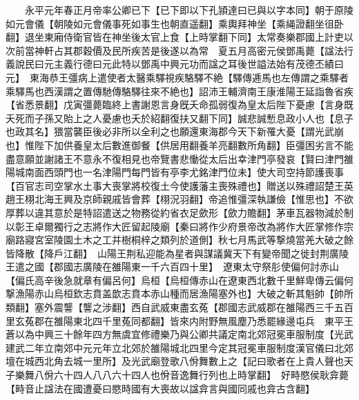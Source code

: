 　　永平元年春正月帝率公卿已下【已下即以下孔頴達曰已與以字本同】朝于原陵如元會儀【朝陵如元會儀事死如事生也朝直遥翻】乘輿拜神坐【乘䋲證翻坐徂卧翻】退坐東廂侍衛官皆在神坐後太官上食【上時掌翻下同】太常奏樂郡國上計吏以次前當神軒占其郡穀價及民所疾苦是後遂以為常　夏五月高密元侯鄧禹薨【諡法行義說民曰元主義行德曰元此特以鄧禹中興元功而諡之耳後世謚法始有茂德丕績曰元】　東海恭王彊病上遣使者太醫乘驛視疾駱驛不絶【驛傳逓馬也左傳謂之乘驛者乘驛馬也西漢謂之置傳馳傳駱驛往來不絶也】詔沛王輔濟南王康淮陽王延詣魯省疾【省悉景翻】戊寅彊薨臨終上書謝恩言身旣夭命孤弱復為皇太后陛下憂慮【言身既夭死而子孫又貽上之人憂慮也夭於紹翻復扶又翻下同】誠悲誠慙息政小人也【息子也政其名】猥當襲臣後必非所以全利之也願還東海郡今天下新罹大憂【謂光武崩也】惟陛下加供養皇太后數進御餐【供居用翻養羊亮翻數所角翻】臣彊困劣言不能盡意願並謝諸王不意永不復相見也帝覽書悲慟從太后出幸津門亭發哀【賢曰津門雒陽城南面西頭門也一名津陽門每門皆有亭李尤銘津門位未】使大司空持節護喪事【百官志司空掌水土事大喪掌將校復土今使護藩主喪殊禮也】贈送以殊禮詔楚王英趙王栩北海王興及京師親戚皆會葬【栩況羽翻】帝追惟彊深執謙儉【惟思也】不欲厚葬以違其意於是特詔遣送之物務從約省衣足歛形【歛力贍翻】茅車瓦器物減於制以彰王卓爾獨行之志將作大匠留起陵廟【秦曰將作少府景帝改為將作大匠掌修作宗廟路寢宮室陵園土木之工并樹桐梓之類列於道側】秋七月馬武等撃燒當羌大破之餘皆降散【降戶江翻】　山陽王荆私迎能為星者與謀議冀天下有變帝聞之徙封荆廣陵王遣之國【郡國志廣陵在雒陽東一千六百四十里】　遼東太守祭肜使偏何討赤山【偏氏高辛後急就章有偏呂何】烏桓【烏桓傳赤山在遼東西北數千里鮮卑傳云偏何撃漁陽赤山烏桓欽志賁盖歆志賁本赤山種而居漁陽塞外也】大破之斬其魁帥【帥所類翻】塞外震讋【讋之涉翻】西自武威東盡玄菟【郡國志武威郡在雒陽西三千五百里玄菟郡在雒陽東北四千里菟同都翻】皆來内附野無風塵乃悉罷緣邊屯兵　東平王蒼以為中興三十餘年四方無虞宜修禮樂乃與公卿共議定南北郊冠冕車服制度【光武建武二年立南郊中元元年立北郊於雒陽城北四里今定其冠冕車服制度漢官儀曰北郊壇在城西北角去城一里所】及光武廟登歌八佾舞數上之【記曰歌者在上貴人聲也天子樂舞八佾六十四人八八六十四人也佾音逸舞行列也上時掌翻】　好畤愍侯耿弇薨【畤音止諡法在國遭憂曰愍時國有大喪故以諡弇言與國同戚也弇古含翻】

